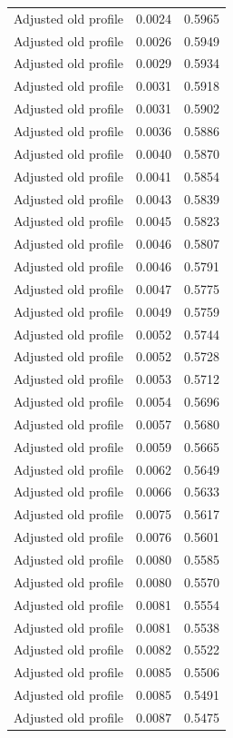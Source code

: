\begin{table}[htbp]
\begin{tabular}{lll}
Adjusted old profile & 0.0024 & 0.5965 \\
Adjusted old profile & 0.0026 & 0.5949 \\
Adjusted old profile & 0.0029 & 0.5934 \\
Adjusted old profile & 0.0031 & 0.5918 \\
Adjusted old profile & 0.0031 & 0.5902 \\
Adjusted old profile & 0.0036 & 0.5886 \\
Adjusted old profile & 0.0040 & 0.5870 \\
Adjusted old profile & 0.0041 & 0.5854 \\
Adjusted old profile & 0.0043 & 0.5839 \\
Adjusted old profile & 0.0045 & 0.5823 \\
Adjusted old profile & 0.0046 & 0.5807 \\
Adjusted old profile & 0.0046 & 0.5791 \\
Adjusted old profile & 0.0047 & 0.5775 \\
Adjusted old profile & 0.0049 & 0.5759 \\
Adjusted old profile & 0.0052 & 0.5744 \\
Adjusted old profile & 0.0052 & 0.5728 \\
Adjusted old profile & 0.0053 & 0.5712 \\
Adjusted old profile & 0.0054 & 0.5696 \\
Adjusted old profile & 0.0057 & 0.5680 \\
Adjusted old profile & 0.0059 & 0.5665 \\
Adjusted old profile & 0.0062 & 0.5649 \\
Adjusted old profile & 0.0066 & 0.5633 \\
Adjusted old profile & 0.0075 & 0.5617 \\
Adjusted old profile & 0.0076 & 0.5601 \\
Adjusted old profile & 0.0080 & 0.5585 \\
Adjusted old profile & 0.0080 & 0.5570 \\
Adjusted old profile & 0.0081 & 0.5554 \\
Adjusted old profile & 0.0081 & 0.5538 \\
Adjusted old profile & 0.0082 & 0.5522 \\
Adjusted old profile & 0.0085 & 0.5506 \\
Adjusted old profile & 0.0085 & 0.5491 \\
Adjusted old profile & 0.0087 & 0.5475 \\

\end{tabular}
\end{table}
